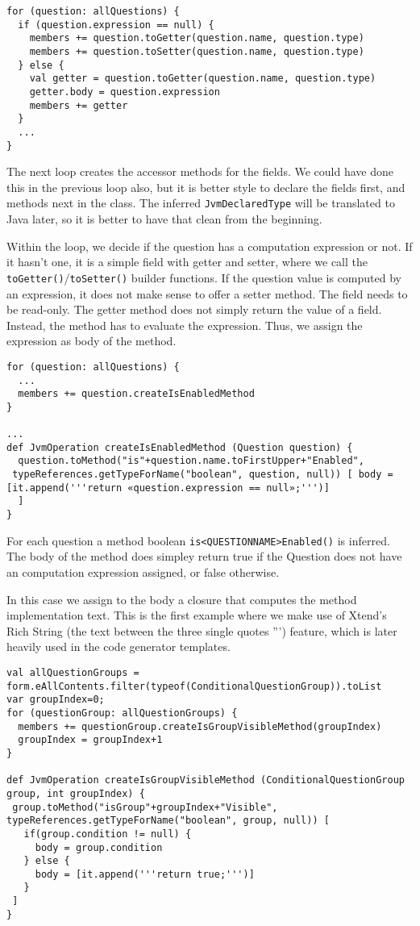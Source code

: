 \begin{lstlisting}[language=Xtend]
for (question: allQuestions) {
  if (question.expression == null) {
    members += question.toGetter(question.name, question.type)
    members += question.toSetter(question.name, question.type)
  } else {
    val getter = question.toGetter(question.name, question.type)
    getter.body = question.expression
    members += getter
  }
  ...
}
\end{lstlisting}

The next loop creates the accessor methods for the fields. We could have done
this in the previous loop also, but it is better style to declare the fields
first, and methods next in the class. The inferred \texttt{JvmDeclaredType} will be
translated to Java later, so it is better to have that clean from the beginning.

Within the loop, we decide if the question has a computation expression or not.
If it hasn't one, it is a simple field with getter and setter, where we call the
\texttt{toGetter()}/\texttt{toSetter()} builder functions. If the question value is computed by an
expression, it does not make sense to offer a setter method. The field needs to
be read-only. The getter method does not simply return the value of a field.
Instead, the method has to evaluate the expression. Thus, we assign the
expression as body of the method.

\begin{lstlisting}[language=Xtend]
for (question: allQuestions) {
  ...
  members += question.createIsEnabledMethod
}

...
def JvmOperation createIsEnabledMethod (Question question) {
  question.toMethod("is"+question.name.toFirstUpper+"Enabled",
 typeReferences.getTypeForName("boolean", question, null)) [ body = [it.append('''return «question.expression == null»;''')]
  ]
}
\end{lstlisting}

For each question a method boolean \texttt{is<QUESTIONNAME>Enabled()} is
inferred. The body of the method does simpley return true if the Question does
not have an computation expression assigned, or false otherwise.

In this case we assign to the body a closure that computes the method
implementation text. This is the first example where we make use of Xtend's Rich
String (the text between the three single quotes ''') feature, which is later
heavily used in the code generator templates.

\begin{lstlisting}[language=Xtend]
val allQuestionGroups = form.eAllContents.filter(typeof(ConditionalQuestionGroup)).toList
var groupIndex=0;
for (questionGroup: allQuestionGroups) {
  members += questionGroup.createIsGroupVisibleMethod(groupIndex)
  groupIndex = groupIndex+1
}

def JvmOperation createIsGroupVisibleMethod (ConditionalQuestionGroup group, int groupIndex) {
 group.toMethod("isGroup"+groupIndex+"Visible", typeReferences.getTypeForName("boolean", group, null)) [
   if(group.condition != null) {
     body = group.condition
   } else {
     body = [it.append('''return true;''')]
   }
 ]
}
\end{lstlisting}

